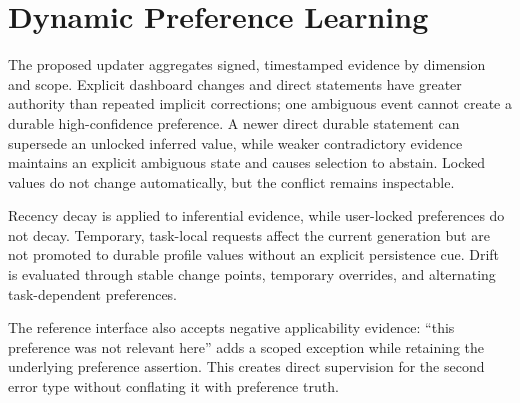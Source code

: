 \section{Dynamic Preference Learning}
\label{sec:learning}

The proposed updater aggregates signed, timestamped evidence by dimension and
scope. Explicit dashboard changes and direct statements have greater authority
than repeated implicit corrections; one ambiguous event cannot create a durable
high-confidence preference. A newer direct durable statement can supersede an
unlocked inferred value, while weaker contradictory evidence maintains an
explicit ambiguous state and causes selection to abstain. Locked values do not
change automatically, but the conflict remains inspectable.

Recency decay is applied to inferential evidence, while user-locked preferences do
not decay. Temporary, task-local requests affect the current generation but are
not promoted to durable profile values without an explicit persistence cue. Drift
is evaluated through stable change points, temporary overrides, and alternating
task-dependent preferences.

The reference interface also accepts negative applicability evidence: ``this
preference was not relevant here'' adds a scoped exception while retaining the
underlying preference assertion. This creates direct supervision for the second
error type without conflating it with preference truth.

